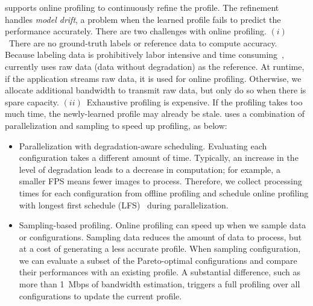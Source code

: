  \sysname{} supports online profiling to continuously
refine the profile. The refinement handles \textit{model drift}, a problem when
the learned profile fails to predict the performance accurately. There are two
challenges with online profiling.  $(i)$~There are no ground-truth labels or
reference data to compute accuracy. Because labeling data is prohibitively labor
intensive and time consuming~\cite{russell2008labelme}, \sysname{} currently
uses raw data (data without degradation) as the reference. At runtime, if the
application streams raw data, it is used for online profiling. Otherwise, we
allocate additional bandwidth to transmit raw data, but only do so when there is
spare capacity. $(ii)$~Exhaustive profiling is expensive. If the profiling takes
too much time, the newly-learned profile may already be stale. \sysname{} uses a
combination of parallelization and sampling to speed up profiling, as below:

\begin{itemize}[leftmargin=*, topsep=3pt]

\item Parallelization with degradation-aware scheduling. Evaluating each
  configuration takes a different amount of time. Typically, an increase in the
  level of degradation leads to a decrease in computation; for example, a
  smaller FPS means fewer images to process. Therefore, we collect processing
  times for each configuration from offline profiling and schedule online
  profiling with longest first schedule (LFS)~\cite{karger2010scheduling} during
  parallelization.

\item Sampling-based profiling. Online profiling can speed up when we sample
  data or configurations. Sampling data reduces the amount of data to process,
  but at a cost of generating a less accurate profile. When sampling
  configuration, we can evaluate a subset of the Pareto-optimal configurations
  and compare their performances with an existing profile. A substantial
  difference, such as more than \SI{1}{Mbps} of bandwidth estimation, triggers a
  full profiling over all configurations to update the current profile.

\end{itemize}


